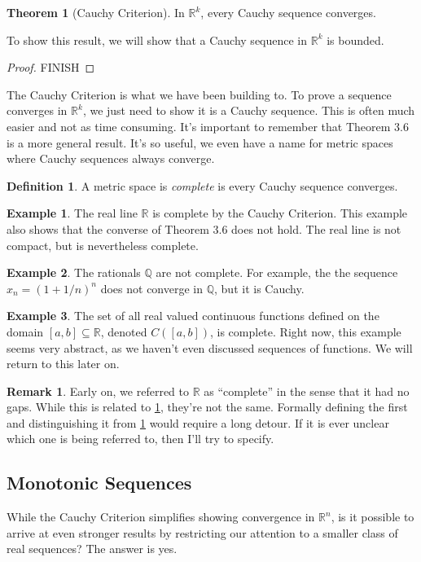 \documentclass{article}
\newcommand{\R}{\mathbb{R}}
\newcommand{\Q}{\mathbb{Q}}
\theoremstyle{definition}
\newtheorem{theorem}{Theorem}[section]
\newtheorem{definition}{Definition}[section]
\newtheorem{example}{Example}[section]
\newtheorem{remark}{Remark}[section]
\begin{document}
	\begin{theorem}[Cauchy Criterion]
		In $ \R^k $, every Cauchy sequence converges.
	\end{theorem}
	To show this result, we will show that a Cauchy sequence in $ \R^k $ is bounded. 
	\begin{proof}
		{\color{red}FINISH}
	\end{proof}
	The Cauchy Criterion is what we have been building to. To prove a sequence converges in $ \R^k $, we just need to show it is a Cauchy sequence. This is often much easier and not as time consuming. It's important to remember that Theorem 3.6 is a more general result. It's so useful, we even have a name for metric spaces where Cauchy sequences always converge.
	\begin{definition}\label{def3.7}
		A metric space is \textit{\color{red}complete} is every Cauchy sequence converges. 
	\end{definition}
	\begin{example}
		The real line $ \R $ is complete by the Cauchy Criterion. This example also shows that the converse of Theorem 3.6 does not hold. The real line is not compact, but is nevertheless complete. 
	\end{example}
	\begin{example}
		The rationals $ \Q $ are not complete. For example, the the sequence $ x_n=(1+1/n)^n $ does not converge in $ \Q $, but it is Cauchy.
	\end{example}
	\begin{example}
		The set of all real valued continuous functions defined on the domain $ [a,b]\subseteq\R $, denoted $ C([a,b]) $, is complete. Right now, this example seems very abstract, as we haven't even discussed sequences of functions. We will return to this later on.  
	\end{example}
	\begin{remark}
		Early on, we referred to $ \R $ as ``complete'' in the sense that it had no gaps. While this is related to \cref{def3.7}, they're not the same. Formally defining the first and distinguishing it from \cref{def3.7} would require a long detour. If it is ever unclear which one is being referred to, then I'll try to specify. 
	\end{remark}
	\subsection{Monotonic Sequences}
	While the Cauchy Criterion simplifies showing convergence in $ \R^n $, is it possible to arrive at even stronger results by restricting our attention to a smaller class of real sequences? The answer is yes. 
	
\end{document}
